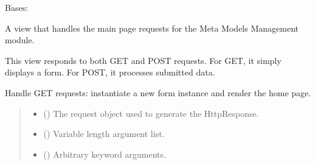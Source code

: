 \documentclass[letterpaper,10pt,english]{sphinxmanual}
\begin{document}
\begin{fulllineitems}
\label{\detokenize{source/meta_models_management:meta_models_management.views.HomeView}}
\pysigstartsignatures
{}
\pysigstopsignatures
\sphinxAtStartPar
Bases: 

\sphinxAtStartPar
A view that handles the main page requests for the Meta Models Management module.

\sphinxAtStartPar
This view responds to both GET and POST requests.
For GET, it simply displays a form. For POST, it processes submitted data.

\begin{fulllineitems}
\label{\detokenize{source/meta_models_management:meta_models_management.views.HomeView.get}}
\pysigstartsignatures
{}
\pysigstopsignatures
\sphinxAtStartPar
Handle GET requests: instantiate a new form instance and render the home page.
\begin{quote}\begin{description}
\begin{itemize}
\item {} 
\sphinxAtStartPar
{} () \textendash{} The request object used to generate the HttpResponse.

\item {} 
\sphinxAtStartPar
{} () \textendash{} Variable length argument list.

\item {} 
\sphinxAtStartPar
{} () \textendash{} Arbitrary keyword arguments.


\end{itemize}
\end{description}
\end{quote}
\end{fulllineitems}
\end{fulllineitems}
\end{document}
